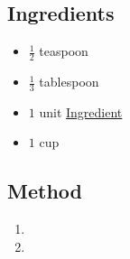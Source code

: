 \documentclass[11pt,a4paper]{article}
\begin{document}
\subsection*{Ingredients}

\begin{multicols}{2}

\begin{itemize}
  \item $ \frac{1}{2} $ teaspoon
  \item $ \frac{1}{3} $ tablespoon
  \item $ 1 $ unit \href{https://en.wikipedia.org/wiki/Ingredient}{Ingredient}
\end{itemize}

\columnbreak

\begin{itemize}
\item $ 1 $ cup
\end{itemize}

\end{multicols}

\medskip

\subsection*{Method}

\begin{enumerate}
  \item \lipsum[2]
  \item \lipsum[3]
\end{enumerate}
\end{document}
